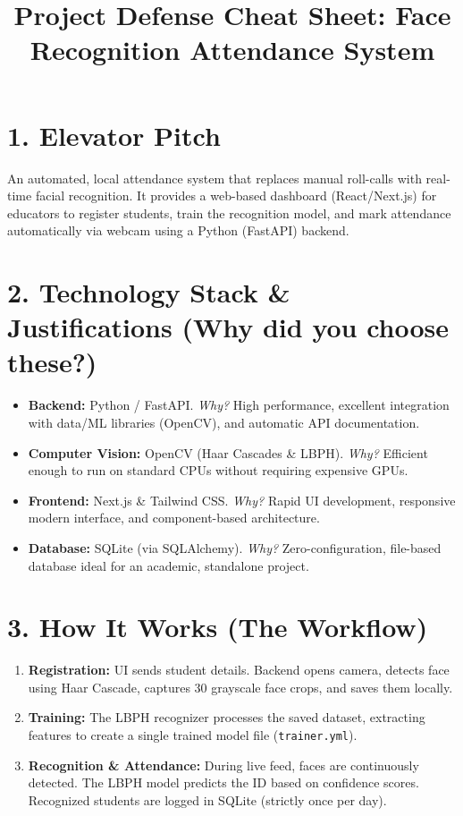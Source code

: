 \documentclass[10pt]{article}
\title{\vspace{-2em}\Large \textbf{Project Defense Cheat Sheet: Face Recognition Attendance System}}
\author{}
\date{\vspace{-2em}}
\begin{document}
\maketitle

\section*{1. Elevator Pitch}
An automated, local attendance system that replaces manual roll-calls with real-time facial recognition. It provides a web-based dashboard (React/Next.js) for educators to register students, train the recognition model, and mark attendance automatically via webcam using a Python (FastAPI) backend.

\section*{2. Technology Stack \& Justifications (Why did you choose these?)}
\begin{itemize}[leftmargin=*, parsep=0pt, itemsep=3pt]
    \item \textbf{Backend:} Python / FastAPI. \textit{Why?} High performance, excellent integration with data/ML libraries (OpenCV), and automatic API documentation.
    \item \textbf{Computer Vision:} OpenCV (Haar Cascades \& LBPH). \textit{Why?} Efficient enough to run on standard CPUs without requiring expensive GPUs. 
    \item \textbf{Frontend:} Next.js \& Tailwind CSS. \textit{Why?} Rapid UI development, responsive modern interface, and component-based architecture.
    \item \textbf{Database:} SQLite (via SQLAlchemy). \textit{Why?} Zero-configuration, file-based database ideal for an academic, standalone project.
\end{itemize}

\section*{3. How It Works (The Workflow)}
\begin{enumerate}[leftmargin=*, parsep=0pt, itemsep=3pt]
    \item \textbf{Registration:} UI sends student details. Backend opens camera, detects face using Haar Cascade, captures 30 grayscale face crops, and saves them locally.
    \item \textbf{Training:} The LBPH recognizer processes the saved dataset, extracting features to create a single trained model file (\texttt{trainer.yml}).
    \item \textbf{Recognition \& Attendance:} During live feed, faces are continuously detected. The LBPH model predicts the ID based on confidence scores. Recognized students are logged in SQLite (strictly once per day).
\end{enumerate}
\end{document}
